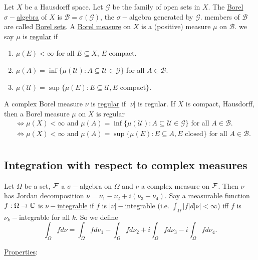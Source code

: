 \documentclass{article}
\begin{document}
Let $X$ be a Hausdorff space. Let $\mathcal{G}$ be the family of open sets in $X$. The \noindent\underline{Borel $\sigma-$algebra} of $X$ is $\mathcal{B}=\sigma(\mathcal{G})$, the $\sigma-$algebra generated by $\mathcal{G}$. members of $\mathcal{B}$ are called \noindent\underline{Borel sets}. A \noindent\underline{Borel measure} on $X$ is a (positive) measure $\mu$ on $\mathcal{B}$. we say $\mu$ is \noindent\underline{regular} if 
\begin{enumerate}[label = (\roman*), align = left]
    \item $\mu(E)<\infty$ for all $E\subseteq X$, $E$ compact.
    \item $\mu(A)=\inf\{\mu(\mathcal{U}):A\subseteq \mathcal{U}\in \mathcal{G}\}$ for all $A\in\mathcal{B}$.
    \item $\mu(\mathcal{U})=\sup\{\mu(E):E\subseteq \mathcal{U}, E \text{ compact}\}$.
\end{enumerate}
A complex Borel measure $\nu$ is \noindent\underline{regular} if $|\nu|$ is regular. If $X$ is compact, Hausdorff, then a Borel measure $\mu$ on $X$ is regular\\
$$
\begin{array}{ll}
    &\iff \mu(X)<\infty  \text{ and } \mu(A)=\inf\{\mu(\mathcal{U}):A\subseteq \mathcal{U}\in \mathcal{G}\} \text{ for all } A\in\mathcal{B}.\\
    &\iff \mu(X)<\infty \text{ and } \mu(A)=\sup\{\mu(E):E\subseteq A, E \text{ closed}\} \text{ for all } A\in\mathcal{B}.\\
    \end{array}
$$
\subsection{Integration with respect to complex measures}

Let $\Omega$ be a set, $\mathcal{F}$ a $\sigma-$algebra on $\Omega$ and $\nu$ a complex measure on $\mathcal{F}$. Then $\nu$ has Jordan decomposition $\nu = \nu_1-\nu_2+i(\nu_3-\nu_4)$. Say a measurable function $f:\Omega\to \mathbb{C}$ is \noindent\underline{$\nu-$integrable} if $f$ is $|\nu|-$integrable (i.e. $\int_\Omega |f|d|\nu|<\infty$) iff $f$ is $\nu_k-$integrable for all $k$. So we define
$$
\displaystyle\int_\Omega f d\nu = \displaystyle\int_\Omega f d\nu_1-\displaystyle\int_\Omega f d\nu_2+i\displaystyle\int_\Omega f d\nu_3-i\displaystyle\int_\Omega f d\nu_4.
$$

\noindent\underline{Properties}:
\end{document}
